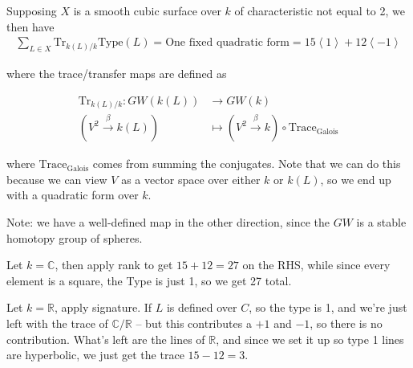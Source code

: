 \begin{theorem}[?]

Supposing \(X\) is a smooth cubic surface over \(k\) of characteristic
not equal to 2, we then have
\begin{align*}
\sum_{L \in X}\mathrm{Tr}_{k(L) / k}\mathrm{Type}(L) = \text{One fixed quadratic form} = 15 \left\langle{1}\right\rangle + 12 \left\langle{-1}\right\rangle
\end{align*}

where the trace/transfer maps are defined as

\begin{align*}
\mathrm{Tr}_{k(L) / k}: GW(k(L)) &\to GW(k) \\
(V^2 \xrightarrow{\beta} k(L)) &\mapsto (V^2 \xrightarrow{\beta} k) \circ \mathrm{Trace}_\text{Galois}
\end{align*}

where \(\mathrm{Trace}_\text{Galois}\) comes from summing the
conjugates. Note that we can do this because we can view \(V\) as a
vector space over either \(k\) or \(k(L)\), so we end up with a
quadratic form over \(k\).

\end{theorem}

\begin{remark}

Note: we have a well-defined map in the other direction, since the
\(GW\) is a stable homotopy group of spheres.

\end{remark}

\begin{example}

Let \(k={\mathbb{C}}\), then apply rank to get \(15+12=27\) on the RHS,
while since every element is a square, the Type is just 1, so we get 27
total.

\end{example}

\begin{example}[Reals]

Let \(k={\mathbb{R}}\), apply signature. If \(L\) is defined over \(C\),
so the type is 1, and we're just left with the trace of
\({\mathbb{C}}/{\mathbb{R}}\) -- but this contributes a \(+1\) and
\(-1\), so there is no contribution. What's left are the lines of
\({\mathbb{R}}\), and since we set it up so type 1 lines are hyperbolic,
we just get the trace \(15-12=3\).

\end{example}

